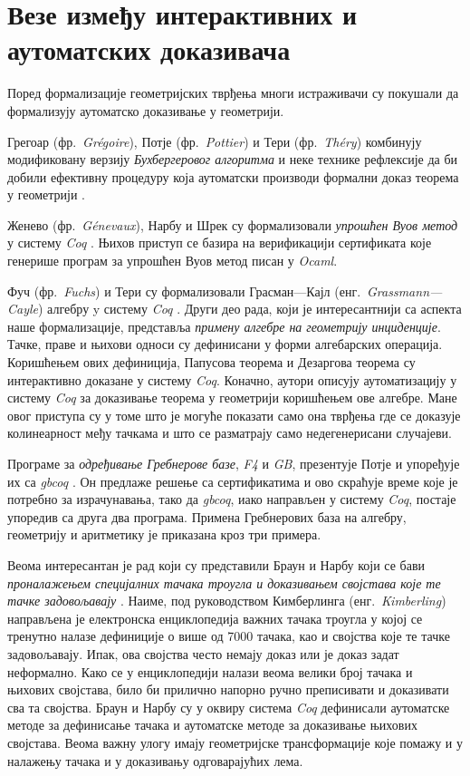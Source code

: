 \section{Везе између интерактивних и аутоматских доказивача}

Поред формализације геометријских тврђења многи истраживачи су
покушали да формализују аутоматско доказивање у геометрији.

Грегоар (фр.~\emph{Gr\'egoire}), Потје (фр.~\emph{Pottier}) и Тери
(фр.~\emph{Th\'ery}) комбинују модификовану верзију
\emph{Бухбергеровог алгоритма} и неке технике рефлексије да би добили
ефективну процедуру која аутоматски производи формални доказ теорема у
геометрији \cite{grobnercoq}.

Женево (фр.~\emph{G\'enevaux}), Нарбу и Шрек су формализовали
\emph{упрошћен Вуов метод} у систему \emph{Coq} \cite{wucoq}. Њихов
приступ се базира на верификацији сертификата које генерише програм за
упрошћен Вуов метод писан у \emph{Ocaml}.

Фуч (фр.~\emph{Fuchs}) и Тери су формализовали Грасман---Кајл
(енг.~\emph{Grassmann---Cayle}) алгебру y систему \emph{Coq}
\cite{grassman}. Други део рада, који је интересантнији са аспекта
наше формализације, представља \emph{примену алгебре на геометрију
  инциденције}. Тачке, праве и њихови односи су дефинисани у форми
алгебарских операција. Коришћењем ових дефиниција, Папусова теорема и
Дезаргова теорема су интерактивно доказане у систему
\emph{Coq}. Коначно, аутори описују аутоматизацију у систему
\emph{Coq} за доказивање теорема у геометрији коришћењем ове
алгебре. Мане овог приступа су у томе што је могуће показати само она
тврђења где се доказује колинеарност међу тачкама и што се разматрају
само недегенерисани случајеви.

Програме за \emph{одређивање Гребнерове базе}, \emph{F4} и \emph{GB},
презентује Потје \cite{pottier2010connecting} и упоређује их са
\emph{gbcoq} \cite{grobner_coq}. Он предлаже решење са сертификатима и
ово скраћује време које је потребно за израчунавања, тако да
\emph{gbcoq}, иако направљен у систему \emph{Coq}, постаје упоредив са
друга два програма. Примена Гребнерових база на алгебру, геометрију и
аритметику је приказана кроз три примера.

Веома интересантан је рад који су представили Браун и Нарбу који се
бави \emph{проналажењем специјалних тачака троугла и доказивањем
  својстава које те тачке задовољавају}
\cite{narboux2015towards}. Наиме, под руководством Кимберлинга
(енг.~\emph{Kimberling}) направљена је електронска енциклопедија
важних тачака троугла у којој се тренутно налазе дефиниције о више од
7000 тачака, као и својства које те тачке задовољавају. Ипак, ова
својства често немају доказ или је доказ задат неформално. Како се у
енциклопедији налази веома велики број тачака и њихових својстава,
било би прилично напорно ручно преписивати и доказивати сва та
својства. Браун и Нарбу су у оквиру система \emph{Coq} дефинисали
аутоматске методе за дефинисање тачака и аутоматске методе за
доказивање њихових својстава. Веома важну улогу имају геометријске
трансформације које помажу и у налажењу тачака и у доказивању
одговарајућих лема.

